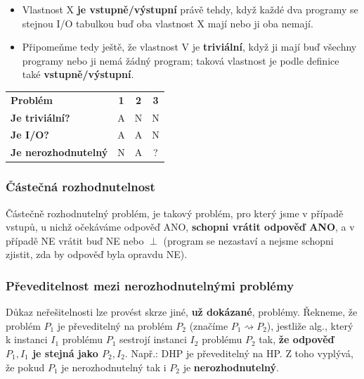 \begin{itemize}
\item Vlastnost X \textbf{je vstupně/výstupní} právě tehdy, když každé dva programy se stejnou I/O tabulkou buď oba vlastnost X mají nebo ji oba nemají.
\item Připomeňme tedy ještě, že vlastnost V je \textbf{triviální}, když ji mají buď všechny programy nebo ji nemá žádný program; taková vlastnost je podle definice také \textbf{vstupně/výstupní}.
\end{itemize}

\begin{table}[H]
	\centering
	\begin{tabular}{l|c|c|c}
		\textbf{Problém}            & \textbf{1} & \textbf{2} & \textbf{3} \\\hhline
		\textbf{Je triviální?}      &     A       &      N      &      N      \\ 
		\textbf{Je I/O?}            &   A         &        A    &        N    \\
		\textbf{Je nerozhodnutelný} &         N   &       A     &           ?
	\end{tabular}
\end{table}

\subsubsection{Částečná rozhodnutelnost}
Částečně rozhodnutelný problém, je takový problém, pro který jsme v případě vstupů, u nichž očekáváme odpověď ANO, \textbf{schopni vrátit odpověď ANO}, a v případě NE vrátit buď NE nebo $\perp$ (program se nezastaví a nejsme schopni zjistit, zda by odpověď byla opravdu NE).

\subsubsection{Převeditelnost mezi nerozhodnutelnými problémy}
Důkaz neřešitelnosti lze provést skrze jiné, \textbf{už dokázané}, problémy. Řekneme, že problém $P_1$ je převeditelný na problém $P_2$ (značíme $P_1 \rightsquigarrow P_2$), jestliže alg., který k instanci $I_1$ problému $P_1$ sestrojí instanci $I_2$ problému $P_2$ tak, \textbf{že odpověď $P_1, I_1$ je stejná jako $P_2, I_2$}. Např.: DHP je převeditelný na HP.  Z toho vyplývá, že pokud $P_1$ je nerozhodnutelný tak i $P_2$ je \textbf{nerozhodnutelný}.

